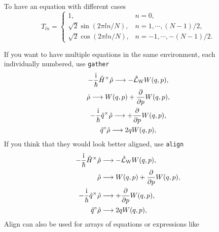 \documentclass[11pt]{article}
\begin{document}
To have an equation with different cases
\begin{equation}
    T_{ln}=
    \begin{cases}
        1, & n=0, \\
        \sqrt{2}\sin(2\pi ln/N), & n = 1, \cdots, (N-1)/2, \\
        \sqrt{2}\cos(2\pi ln/N), & n = -1, \cdots, -(N-1)/2.
    \end{cases}
\end{equation}

If you want to have multiple equations in the same environment, each individually numbered, use \texttt{gather}
\begin{gather}
    -\frac{\ui}{\hbar} \hat{H}^\times \hat{\rho} \longrightarrow
    -\hat{\mathcal{L}}_\mathrm{W} W(q,p),\\
    \hat{\rho} \longrightarrow W(q,p) +\diffp{}{p} W(q,p),\\
    -\frac{\mathrm{i}}{\hbar} \hat{q}^\times \hat{\rho} \longrightarrow +\diffp{}{p} W(q,p),\\
    \hat{q}^\circ \hat{\rho} \longrightarrow 2qW(q,p),
\end{gather}
If you think that they would look better aligned, use \texttt{align}
\begin{align}
    -\frac{\mathrm{i}}{\hbar} \hat{H}^\times \hat{\rho} &\longrightarrow
    -\hat{\mathcal{L}}_\mathrm{W} W(q,p),\\
    \hat{\rho} &\longrightarrow W(q,p) +\diffp{}{p} W(q,p),\\
    -\frac{\mathrm{i}}{\hbar} \hat{q}^\times \hat{\rho} &\longrightarrow +\diffp{}{p} W(q,p),\\
    \hat{q}^\circ \hat{\rho} &\longrightarrow 2qW(q,p),
\end{align}
Align can also be used for arrays of equations or expressions like
\end{document}
